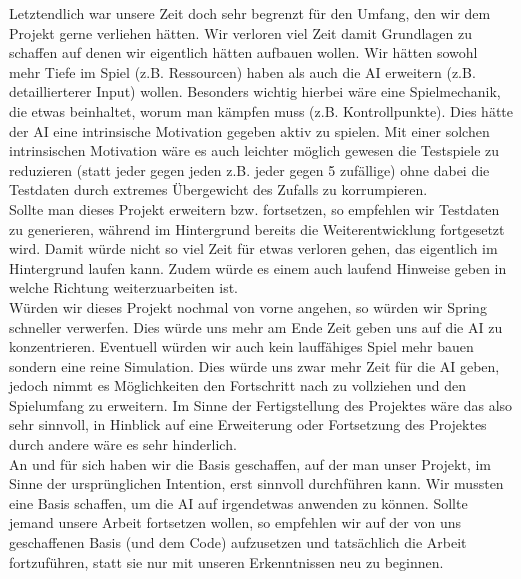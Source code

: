\documentclass[
	12pt,
	a4paper,
	BCOR10mm,
	DIV14,
	headsepline,
	usegeometry,
]{scrreprt}
\begin{document}
Letztendlich war unsere Zeit doch sehr begrenzt für den Umfang, den wir dem Projekt gerne verliehen hätten. Wir verloren viel Zeit damit Grundlagen zu schaffen auf denen wir eigentlich hätten aufbauen wollen. Wir hätten sowohl mehr Tiefe im Spiel (z.B. Ressourcen) haben als auch die AI erweitern (z.B. detaillierterer Input) wollen. Besonders wichtig hierbei wäre eine Spielmechanik, die etwas beinhaltet, worum man kämpfen muss (z.B. Kontrollpunkte). Dies hätte der AI eine intrinsische Motivation gegeben aktiv zu spielen. Mit einer solchen intrinsischen Motivation wäre es auch leichter möglich gewesen die Testspiele zu reduzieren (statt jeder gegen jeden z.B. jeder gegen 5 zufällige) ohne dabei die Testdaten durch extremes Übergewicht des Zufalls zu korrumpieren.\\
Sollte man dieses Projekt erweitern bzw. fortsetzen, so empfehlen wir Testdaten zu generieren, während im Hintergrund bereits die Weiterentwicklung fortgesetzt wird. Damit würde nicht so viel Zeit für etwas verloren gehen, das eigentlich im Hintergrund laufen kann. Zudem würde es einem auch laufend Hinweise geben in welche Richtung weiterzuarbeiten ist.\\
Würden wir dieses Projekt nochmal von vorne angehen, so würden wir Spring schneller verwerfen. Dies würde uns mehr am Ende Zeit geben uns auf die AI zu konzentrieren. Eventuell würden wir auch kein lauffähiges Spiel mehr bauen sondern eine reine Simulation. Dies würde uns zwar mehr Zeit für die AI geben, jedoch nimmt es Möglichkeiten den Fortschritt nach zu vollziehen und den Spielumfang zu erweitern. Im Sinne der Fertigstellung des Projektes wäre das also sehr sinnvoll, in Hinblick auf eine Erweiterung oder Fortsetzung des Projektes durch andere wäre es sehr hinderlich.\\
An und für sich haben wir die Basis geschaffen, auf der man unser Projekt, im Sinne der ursprünglichen Intention, erst sinnvoll durchführen kann. Wir mussten eine Basis schaffen, um die AI auf irgendetwas anwenden zu können. Sollte jemand unsere Arbeit fortsetzen wollen, so empfehlen wir auf der von uns geschaffenen Basis (und dem Code) aufzusetzen und tatsächlich die Arbeit fortzuführen, statt sie nur mit unseren Erkenntnissen neu zu beginnen.


%
%

\appendix
\appendixpage



\listoffigures
\printbibliography
\end{document}
